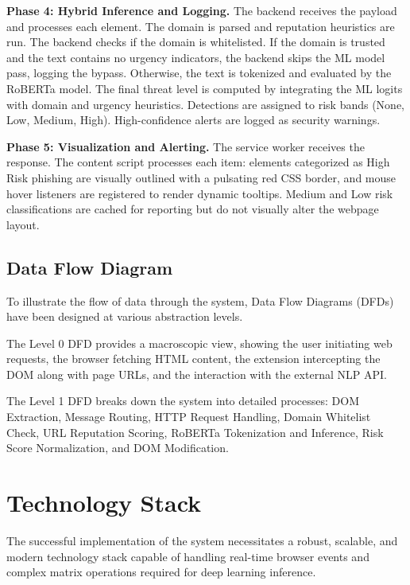 \documentclass[12pt,a4paper]{report}
\begin{document}
\textbf{Phase 4: Hybrid Inference and Logging.} The backend receives the payload and processes each element. The domain is parsed and reputation heuristics are run. The backend checks if the domain is whitelisted. If the domain is trusted and the text contains no urgency indicators, the backend skips the ML model pass, logging the bypass. Otherwise, the text is tokenized and evaluated by the RoBERTa model. The final threat level is computed by integrating the ML logits with domain and urgency heuristics. Detections are assigned to risk bands (None, Low, Medium, High). High-confidence alerts are logged as security warnings.

\textbf{Phase 5: Visualization and Alerting.} The service worker receives the response. The content script processes each item: elements categorized as High Risk phishing are visually outlined with a pulsating red CSS border, and mouse hover listeners are registered to render dynamic tooltips. Medium and Low risk classifications are cached for reporting but do not visually alter the webpage layout.

\section{Data Flow Diagram}
To illustrate the flow of data through the system, Data Flow Diagrams (DFDs) have been designed at various abstraction levels.

The Level 0 DFD provides a macroscopic view, showing the user initiating web requests, the browser fetching HTML content, the extension intercepting the DOM along with page URLs, and the interaction with the external NLP API.

The Level 1 DFD breaks down the system into detailed processes: DOM Extraction, Message Routing, HTTP Request Handling, Domain Whitelist Check, URL Reputation Scoring, RoBERTa Tokenization and Inference, Risk Score Normalization, and DOM Modification.

\chapter{Technology Stack}

The successful implementation of the system necessitates a robust, scalable, and modern technology stack capable of handling real-time browser events and complex matrix operations required for deep learning inference.
\end{document}
